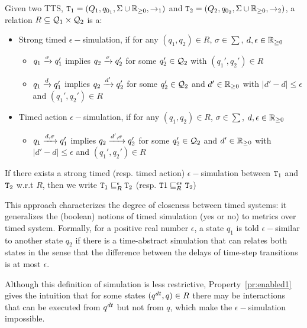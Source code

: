 \begin{definition}\label{def:esim}
  Given two TTS, $\texttt{T}_{1}=(Q_{1},q_{0_{1}},\Sigma\cup\mathbb{R}_{\ge 0},\to_{1})$ and $\texttt{T}_{2}=(Q_{2},q_{0_{2}},\Sigma\cup\mathbb{R}_{\ge 0},\to_{2})$, a relation $R\subseteq\mathcal{Q}_1\times\mathcal{Q}_2$ is a:
  \begin{itemize}
    \item Strong timed $\epsilon-$simulation, if for any $(q_1,q_2)\in R$, $\sigma\in\sum$, 
      $d,\epsilon\in\mathbb{R}_{\ge 0}$
    \begin{itemize}
      \item $q_1\xrightarrow{\sigma}q_1'$ implies $q_2\xrightarrow{\sigma}q_2'$ for some $q_2'\in\mathcal{Q}_2$ 
        with $(q_1',q_2')\in R$
      \item $q_1\xrightarrow{d}q_1'$ implies $q_2\xrightarrow{d'}q_2'$ for some $q_2'\in\mathcal{Q}_2$ and 
        $d'\in\mathbb{R}_{\ge 0}$ with $|d'-d|\le\epsilon$ and $(q_1',q_2')\in R$
    \end{itemize}
    \item Timed action $\epsilon-$simulation, if for any $(q_1,q_2)\in R$, $\sigma\in\sum$, 
      $d,\epsilon\in\mathbb{R}_{\ge 0}$
    \begin{itemize}
      \item $q_1\xrightarrow{d,\sigma}q_1'$ implies $q_2\xrightarrow{d',\sigma}q_2'$ for some $q_2'
        \in\mathcal{Q}_2$ and $d'\in\mathbb{R}_{\ge 0}$ with $|d'-d|\le\epsilon$ and $(q_1',q_2')\in R$
    \end{itemize}
  \end{itemize}
  If there exists a strong timed (resp. timed action) $\epsilon-$simulation
  between $\texttt{T}_{1}$ and $\texttt{T}_{2}$ w.r.t $R$, then we write
  $\texttt{T}_{1}\sqsubseteq^{\epsilon}_{R}\texttt{T}_{2}$ (resp. $\texttt{T}{1}\sqsubseteq^{\epsilon*}_{R}
  \texttt{T}_{2})$
\end{definition}


This approach characterizes
the degree of closeness between timed systems: it generalizes the (boolean) 
notions of timed simulation
(yes or no) to metrics over timed system. Formally, for a positive real number
$\epsilon$, a state $q_1$ is 
told $\epsilon-$similar to another state $q_2$ if there is a time-abstract simulation 
that can relates both states in
the sense that the difference between the delays of time-step transitions is at most $\epsilon$.

Although this definition of simulation is less 
restrictive, Property~\ref{pr:enabled1} gives the intuition that for some states
$(q^{dt},q)\in R$ there may be interactions that can be executed from $q^{dt}$ but not from
$q$, which make the $\epsilon-$simulation impossible.

